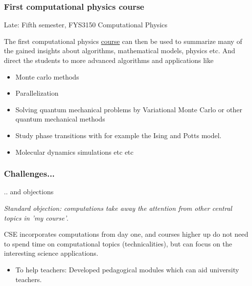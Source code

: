 \documentclass{beamer}
\begin{document}
\begin{frame}
\frametitle{First computational physics course}

\begin{block}{Late: Fifth semester, FYS3150 Computational Physics }

The first computational physics \href{{http://www.uio.no/studier/emner/matnat/fys/FYS3150/h14/}}{course} can then be used to summarize many of the gained insights about algorithms, mathematical models, physics etc. And direct the students to more advanced algorithms and applications like

\begin{itemize}
\item Monte carlo methods

\item Parallelization

\item Solving quantum mechanical problems by Variational Monte Carlo  or other quantum mechanical methods

\item Study phase transitions with for example the Ising and Potts model.

\item Molecular dynamics simulations etc etc 
\end{itemize}

\noindent
\end{block}
\end{frame}

\begin{frame}
\frametitle{Challenges...}

\begin{block}{.. and objections }

\emph{Standard objection: computations take away the attention from other central topics in 'my course'}. 

CSE incorporates computations from day one, and courses higher up do not need to
spend time on computational topics  (technicalities), but can focus on the interesting
science applications.

\begin{itemize}
\item To help teachers: Developed pedagogical modules which can aid university teachers.
\end{itemize}

\noindent
\end{block}
\end{frame}
\end{document}
